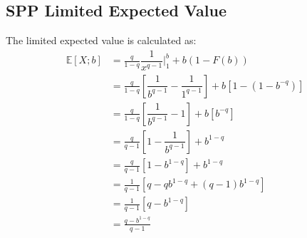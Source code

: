 \documentclass[]{article} %
\begin{document}
\subsection{SPP Limited Expected Value}\label{ParetoLEV}
The limited expected value is calculated as:
\begin{align}
	\mathbb{E}[X;b] 	&= \frac{q}{1-q} \dfrac{1}{x^{q-1}} \Big|_{1}^{b} + b  (1-F(b))\nonumber\\
 	&=  \frac{q}{1-q} \left[ \dfrac{1}{b^{q-1}} - \dfrac{1}{1^{q-1}}\right]+  b  \left[1-(1-b^{-q})\right]\nonumber\\
 	&=  \frac{q}{1-q} \left[ \dfrac{1}{b^{q-1}} - 1\right]+  b  \left[b^{-q}\right]\nonumber\\
 	&=  \frac{q}{q-1} \left[1 - \dfrac{1}{b^{q-1}}\right]+ b^{1-q}\nonumber\\
 	&=  \frac{q}{q-1} \left[1 - b^{1-q}\right]+b^{1-q}\\ %
 	&=  \frac{1}{q-1} \left[q - qb^{1-q} + (q-1)b^{1-q}\right]\nonumber\\
 	&=  \frac{1}{q-1} \left[q - b^{1-q}\right]\nonumber\\
 	&=	\frac{q - b^{1-q}}{q-1}
 \end{align}
 


\end{document}
